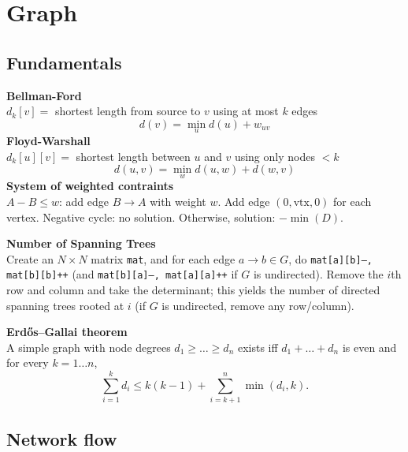 \chapter{Graph}

\section{Fundamentals}
    \textbf{Bellman-Ford}\\
    $d_k[v] =$ shortest length from source to $v$ using at most $k$ edges
    \[
    d(v) = \min_u d(u) + w_{uv}
    \]
    \textbf{Floyd-Warshall}\\
    $d_k[u][v] =$ shortest length between $u$ and $v$ using only nodes $< k$
    \[
    d(u, v) = \min_w d(u, w) + d(w, v)
    \]
    \textbf{System of weighted contraints}\\
    $A - B \leq w$: add edge $B \to A$ with weight $w$.  
    Add edge $(0, \text{vtx}, 0)$ for each vertex.  
    Negative cycle: no solution.  
    Otherwise, solution: $-\min(D)$.

    \textbf{Number of Spanning Trees}\\
    Create an $N\times N$ matrix \texttt{mat}, and for each edge $a \rightarrow b \in G$, do
    \texttt{mat[a][b]--, mat[b][b]++} (and \texttt{mat[b][a]--, mat[a][a]++} if $G$ is undirected).
    Remove the $i$th row and column and take the determinant; this yields the number of directed spanning trees rooted at $i$
    (if $G$ is undirected, remove any row/column).

    \textbf{Erdős–Gallai theorem}\\
    A simple graph with node degrees $d_1 \ge \dots \ge d_n$ exists iff $d_1 + \dots + d_n$ is even and for every $k = 1\dots n$,
    \[ \sum _{i=1}^{k}d_{i}\leq k(k-1)+\sum _{i=k+1}^{n}\min(d_{i},k). \]

\section{Network flow}

